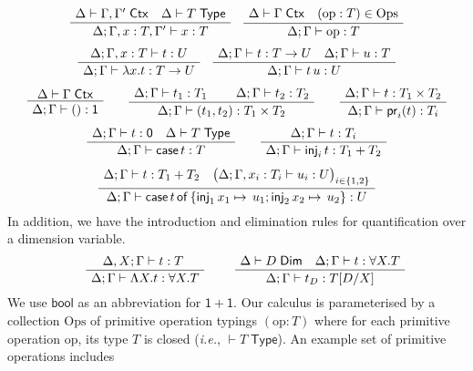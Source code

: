 \documentclass[a4paper,UKenglish]{lipics}
\theoremstyle{plain}
\newcommand{\msf}[1]{\mathsf{#1}} %
\newcommand{\unitTy}{\msf{1}}
\newcommand{\emptyTy}{\msf{0}}
\newcommand{\bool}{\msf{bool}}
\newcommand{\cj}[2]{#1 \vdash #2 \; \msf{ Ctx}}
\newcommand{\Tj}[2]{#1 \vdash #2 \; \msf{ Type}}
\newcommand{\Dj}[2]{#1 \vdash #2 \; \msf{ Dim}}
\newcommand{\tj}[4]{#1;#2 \vdash #3 : #4}
\newcommand{\proj}{\mathsf{pr}}
\newcommand{\inj}{\mathsf{inj}}
\newcommand{\emptyelim}{\mathsf{case}\,}
\newcommand{\case}[5]{\mathsf{case}\,#1\,\mathsf{of}\,\{\inj_1\,#2 \mapsto\,#3; \inj_2\,#4\mapsto\,#5\}}
\newcommand{\Dim}{D}
\newcommand{\Dvar}{X}
\begin{document}
\[\begin{array}{c}%
\AxiomC{%
$\cj \Delta{\Gamma,\Gamma'}\quad
\Tj\Delta T$}
\UnaryInfC
{$\tj \Delta{\Gamma,x:T,\Gamma'}xT$}
\DisplayProof
\quad
\AxiomC{%
$\cj \Delta\Gamma\quad(\mathrm{op}:T) \in \mathrm{Ops}$}
\UnaryInfC
{$\tj \Delta\Gamma{\mathrm{op}}T$}
\DisplayProof
\\[5mm]
\AxiomC{%
$
\tj\Delta {\Gamma,x:T} {t}{U}
$%
}
\UnaryInfC
{$\tj\Delta {\Gamma} {\lambda x.t}{T\to U}$}
\DisplayProof
\quad
\AxiomC{%
$
\tj\Delta {\Gamma} {t}{T\to U}\quad
\tj\Delta {\Gamma} {u}{T}
$%
}
\UnaryInfC
{$\tj \Delta{\Gamma}{t\,u}U$}
\DisplayProof
\\[5mm]
\AxiomC{%
$\cj\Delta {\Gamma}
$%
}
\UnaryInfC
{$\tj \Delta{\Gamma}{()}\unitTy$}
\DisplayProof
\qquad
\AxiomC{$\tj\Delta {\Gamma} {t_1}{T_1}$}
\AxiomC{$\tj\Delta {\Gamma} {t_2}{T_2}$}
\BinaryInfC
{$\tj \Delta{\Gamma}{(t_1,t_2)}{T_1\times T_2}$}
\DisplayProof
\qquad
\AxiomC{%
$
\tj\Delta {\Gamma} {t}{T_1\times T_2}
$%
}
\UnaryInfC
{$\tj\Delta {\Gamma} {\proj_i(t)}{T_i}$}
\DisplayProof
\\[5mm]
\AxiomC{%
$
\tj\Delta {\Gamma} {t}{\emptyTy}
\quad \Tj\Delta T$%
}
\UnaryInfC
{$\tj\Delta {\Gamma} {\emptyelim t}{T}$}
\DisplayProof
\qquad
\AxiomC{%
$
\tj\Delta {\Gamma} {t}{T_i}$}
\UnaryInfC
{$\tj\Delta {\Gamma} {\inj_i\,t}{T_1 + T_2}$}
\DisplayProof
\\[5mm]
\AxiomC{$\tj\Delta {\Gamma} {t}{T_1 + T_2}
\quad \big(\tj\Delta {\Gamma, x_i : T_i} {u_i}{U}\big)_{i\in\{1,2\}}$}
\UnaryInfC
{$\tj\Delta {\Gamma} {\case{t}{x_1}{u_1}{x_2}{u_2}}{U}$}
\DisplayProof
\end{array}\]
%
In addition, we have the introduction and elimination rules for quantification over a dimension variable.
\[\begin{array}{cc}
\hspace{5mm}
\AxiomC{$\tj{\Delta,\Dvar}\Gamma tT$ }
		\UnaryInfC{$\tj \Delta  \Gamma {\Lambda \Dvar.t} {\forall X.T}$}
		\DisplayProof

&\hspace{5mm}
\AxiomC{$\Dj\Delta \Dim \quad \tj \Delta \Gamma  t{\forall \Dvar.T}$}
	\UnaryInfC{$\tj \Delta  \Gamma {t_\Dim}{T[\Dim/\Dvar]}$}
	\DisplayProof
\end{array}\]
%
We use $\bool$ as an abbreviation for $\unitTy + \unitTy$.  Our
calculus is parameterised by a collection $\mathrm{Ops}$ of primitive
operation typings $(\mathrm{op} : T)$ where for each primitive
operation $\mathrm{op}$, its type $T$ is closed (\emph{i.e.},
$\Tj{}T$). An example set of primitive operations includes
\end{document}
